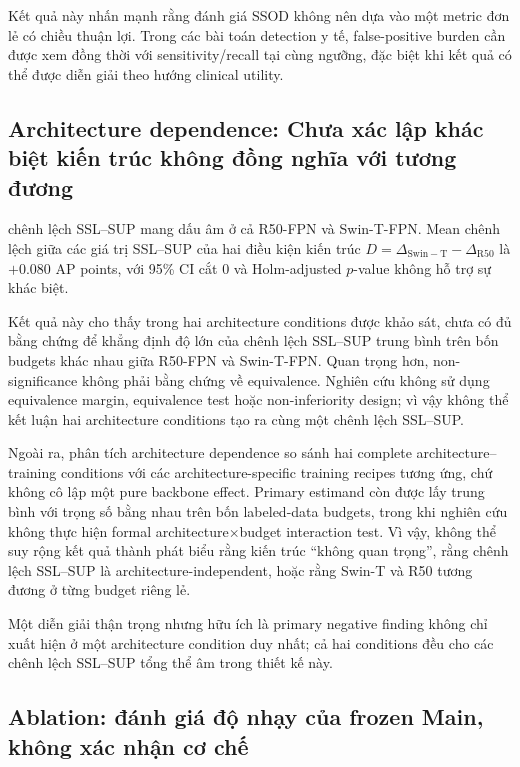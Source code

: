 \documentclass[pdflatex,sn-mathphys-num]{sn-jnl}%
\theoremstyle{thmstyleone}%
\theoremstyle{thmstyletwo}%
\theoremstyle{thmstylethree}%
\begin{document}
Kết quả này nhấn mạnh rằng đánh giá SSOD không nên dựa vào một metric đơn lẻ có chiều thuận lợi. Trong các bài toán detection y tế, false-positive burden cần được xem đồng thời với sensitivity/recall tại cùng ngưỡng, đặc biệt khi kết quả có thể được diễn giải theo hướng clinical utility.

\subsection{Architecture dependence: Chưa xác lập khác biệt kiến trúc không đồng nghĩa với tương đương}

chênh lệch SSL--SUP mang dấu âm ở cả R50-FPN và Swin-T-FPN. Mean chênh lệch giữa các giá trị SSL--SUP của hai điều kiện kiến trúc
\(D=\Delta_{\mathrm{Swin-T}}-\Delta_{\mathrm{R50}}\)
là \(+0.080\) AP points, với 95\% CI cắt 0 và Holm-adjusted $p$-value không hỗ trợ sự khác biệt.

Kết quả này cho thấy trong hai architecture conditions được khảo sát, chưa có đủ bằng chứng để khẳng định độ lớn của chênh lệch SSL--SUP trung bình trên bốn budgets khác nhau giữa R50-FPN và Swin-T-FPN. Quan trọng hơn, non-significance không phải bằng chứng về equivalence. Nghiên cứu không sử dụng equivalence margin, equivalence test hoặc non-inferiority design; vì vậy không thể kết luận hai architecture conditions tạo ra cùng một chênh lệch SSL--SUP.

Ngoài ra, phân tích architecture dependence so sánh hai complete architecture--training conditions với các architecture-specific training recipes tương ứng, chứ không cô lập một pure backbone effect. Primary estimand còn được lấy trung bình với trọng số bằng nhau trên bốn labeled-data budgets, trong khi nghiên cứu không thực hiện formal architecture$\times$budget interaction test. Vì vậy, không thể suy rộng kết quả thành phát biểu rằng kiến trúc ``không quan trọng'', rằng chênh lệch SSL--SUP là architecture-independent, hoặc rằng Swin-T và R50 tương đương ở từng budget riêng lẻ.

Một diễn giải thận trọng nhưng hữu ích là primary negative finding không chỉ xuất hiện ở một architecture condition duy nhất; cả hai conditions đều cho các chênh lệch SSL--SUP tổng thể âm trong thiết kế này.

\subsection{Ablation: đánh giá độ nhạy của frozen Main, không xác nhận cơ chế}
\end{document}
